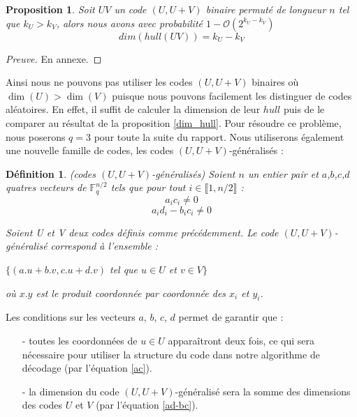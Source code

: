 \documentclass[12pt]{article}
\theoremstyle{plain}
\newtheorem{defi}[thm]{Définition}
\newtheorem{propo}[thm]{Proposition}
\newcommand{\F}{\mathbb{F}}
\begin{document}
\begin{propo}\label{dim_hull_UV}
Soit $UV$ un code $(U,U+V)$ binaire permuté de longueur $n$ tel que $k_U > k_V$, alors nous avons avec probabilité $1-\mathcal{O}(2^{k_U-k_V})$
$$ dim(hull(UV)) = k_U - k_V $$
\end{propo}

\begin{proof}[Preuve]
En annexe.
\end{proof}

\noindent Ainsi nous ne pouvons pas utiliser les codes $(U,U+V)$ binaires où $\dim(U) > \dim(V)$ puisque nous pouvons facilement les distinguer de codes aléatoires.
En effet, il suffit de calculer la dimension de  leur $hull$ puis de le comparer au résultat de la proposition \ref{dim_hull}.
Pour résoudre ce problème, nous poserons $q=3$ pour toute la suite du rapport.
Nous utiliserons également une nouvelle famille de codes, les codes $(U,U+V)$-généralisés :\\
\begin{defi} \label{UV-normalise} (codes $(U,U+V)$-généralisés) Soient $n$ un entier pair et $a$,$b$,$c$,$d$ quatres vecteurs de $\F_q^{n/2}$ tels que pour tout $i \in \llbracket 1,n/2\rrbracket$ :
\begin{equation}\label{ac}
a_ic_i \neq 0 
\end{equation}
\begin{equation}\label{ad-bc}
a_id_i - b_ic_i \neq 0 
\end{equation}

\noindent Soient U et V deux codes définis comme précédemment. Le code $(U,U+V)$-généralisé correspond à l'ensemble :
\begin{center}
$\{(a.u + b.v, c.u + d.v)$ tel que $u \in U$ et $v \in V \}$
\end{center}
où $x.y$ est le produit coordonnée par coordonnée des $x_i$ et $y_i$.\\
\end{defi}


\noindent Les conditions sur les vecteurs $a$, $b$, $c$, $d$ permet de garantir que :
\begin{itemize}
\item[-] toutes les coordonnées de $u \in U$ apparaîtront deux fois, ce qui sera nécessaire pour utiliser la structure du code dans notre algorithme de décodage (par l'équation \eqref{ac}).
\item[-] la dimension du code $(U,U+V)$-généralisé sera la somme des dimensions des codes $U$ et $V$ (par l'équation \eqref{ad-bc}).
\end{itemize}
\end{document}
